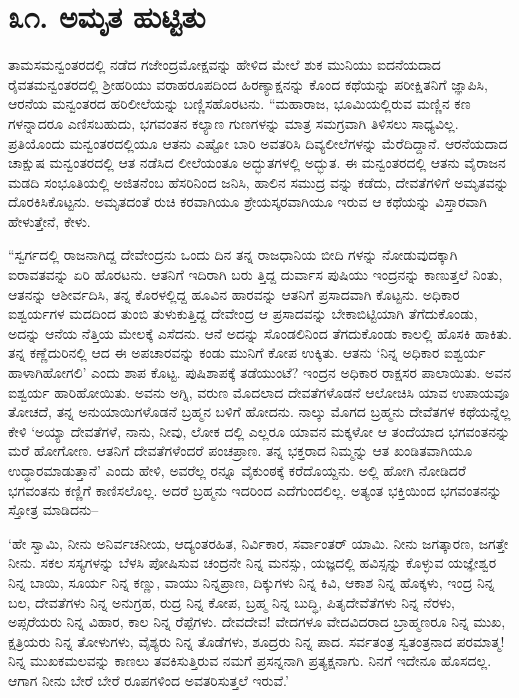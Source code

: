 
\chapter{೩೧. ಅಮೃತ ಹುಟ್ಟಿತು}

ತಾಮಸಮನ್ವಂತರದಲ್ಲಿ ನಡೆದ ಗಜೇಂದ್ರಮೋಕ್ಷವನ್ನು ಹೇಳಿದ ಮೇಲೆ ಶುಕ ಮುನಿಯು ಐದನೆಯದಾದ ರೈವತಮನ್ವಂತರದಲ್ಲಿ ಶ್ರೀಹರಿಯು ವರಾಹರೂಪದಿಂದ ಹಿರಣ್ಯಾಕ್ಷನನ್ನು ಕೊಂದ ಕಥೆಯನ್ನು ಪರೀಕ್ಷಿತನಿಗೆ ಜ್ಞಾಪಿಸಿ, ಆರನೆಯ ಮನ್ವಂತರದ ಹರಿಲೀಲೆಯನ್ನು ಬಣ್ಣಿಸಹೊರಟನು. “ಮಹಾರಾಜ, ಭೂಮಿಯಲ್ಲಿರುವ ಮಣ್ಣಿನ ಕಣ ಗಳನ್ನಾದರೂ ಎಣಿಸಬಹುದು, ಭಗವಂತನ ಕಲ್ಯಾಣ ಗುಣಗಳನ್ನು ಮಾತ್ರ ಸಮಗ್ರವಾಗಿ ತಿಳಿಸಲು ಸಾಧ್ಯವಿಲ್ಲ. ಪ್ರತಿಯೊಂದು ಮನ್ವಂತರದಲ್ಲಿಯೂ ಆತನು ಎಷ್ಟೋ ಬಾರಿ ಅವತರಿಸಿ ದಿವ್ಯಲೀಲೆಗಳನ್ನು ಮೆರೆದಿದ್ದಾನೆ. ಆರನೆಯದಾದ ಚಾಕ್ಷುಷ ಮನ್ವಂತರದಲ್ಲಿ ಆತ ನಡೆಸಿದ ಲೀಲೆಯಂತೂ ಅದ್ಭುತಗಳಲ್ಲಿ ಅದ್ಭುತ. ಈ ಮನ್ವಂತರದಲ್ಲಿ ಆತನು ವೈರಾಜನ ಮಡದಿ ಸಂಭೂತಿಯಲ್ಲಿ ಅಜಿತನೆಂಬ ಹೆಸರಿನಿಂದ ಜನಿಸಿ, ಹಾಲಿನ ಸಮುದ್ರ ವನ್ನು ಕಡೆದು, ದೇವತೆಗಳಿಗೆ ಅಮೃತವನ್ನು ದೊರಕಿಸಿಕೊಟ್ಟನು. ಅಮೃತದಂತೆ ರುಚಿ ಕರವಾಗಿಯೂ ಶ್ರೇಯಸ್ಕರವಾಗಿಯೂ ಇರುವ ಆ ಕಥೆಯನ್ನು ವಿಸ್ತಾರವಾಗಿ ಹೇಳುತ್ತೇನೆ, ಕೇಳು. 

“ಸ್ವರ್ಗದಲ್ಲಿ ರಾಜನಾಗಿದ್ದ ದೇವೇಂದ್ರನು ಒಂದು ದಿನ ತನ್ನ ರಾಜಧಾನಿಯ ಬೀದಿ ಗಳನ್ನು ನೋಡುವುದಕ್ಕಾಗಿ ಐರಾವತವನ್ನು ಏರಿ ಹೊರಟನು. ಆತನಿಗೆ ಇದಿರಾಗಿ ಬರು ತ್ತಿದ್ದ ದುರ್ವಾಸ ಪುಷಿಯು ಇಂದ್ರನನ್ನು ಕಾಣುತ್ತಲೆ ನಿಂತು, ಆತನನ್ನು ಆಶೀರ್ವದಿಸಿ, ತನ್ನ ಕೊರಳಲ್ಲಿದ್ದ ಹೂವಿನ ಹಾರವನ್ನು ಆತನಿಗೆ ಪ್ರಸಾದವಾಗಿ ಕೊಟ್ಟನು. ಅಧಿಕಾರ ಐಶ್ವರ್ಯಗಳ ಮದದಿಂದ ತುಂಬಿ ತುಳುಕುತ್ತಿದ್ದ ದೇವೇಂದ್ರ ಆ ಪ್ರಸಾದವನ್ನು ಬೇಕಾಬಿಟ್ಟಿಯಾಗಿ ತೆಗೆದುಕೊಂಡು, ಅದನ್ನು ಆನೆಯ ನೆತ್ತಿಯ ಮೇಲಕ್ಕೆ ಎಸೆದನು. ಆನೆ ಅದನ್ನು ಸೊಂಡಲಿನಿಂದ ತೆಗದುಕೊಂಡು ಕಾಲಲ್ಲಿ ಹೊಸಕಿ ಹಾಕಿತು. ತನ್ನ ಕಣ್ಣೆದುರಿನಲ್ಲಿ ಆದ ಈ ಅಪಚಾರವನ್ನು ಕಂಡು ಮುನಿಗೆ ಕೋಪ ಉಕ್ಕಿತು. ಆತನು ‘ನಿನ್ನ ಅಧಿಕಾರ ಐಶ್ವರ್ಯ ಹಾಳಾಗಿಹೋಗಲಿ’ ಎಂದು ಶಾಪ ಕೊಟ್ಟ. ಪುಷಿಶಾಪಕ್ಕೆ ತಡೆಯುಂಟೆ? ಇಂದ್ರನ ಅಧಿಕಾರ ರಾಕ್ಷಸರ ಪಾಲಾಯಿತು. ಅವನ ಐಶ್ವರ್ಯ ಹಾರಿಹೋಯಿತು. ಅವನು ಅಗ್ನಿ, ವರುಣ ಮೊದಲಾದ ದೇವತೆಗಳೊಡನೆ ಆಲೋಚಿಸಿ ಯಾವ ಉಪಾಯವೂ ತೋಚದೆ, ತನ್ನ ಅನುಯಾಯಿಗಳೊಡನೆ ಬ್ರಹ್ಮನ ಬಳಿಗೆ ಹೋದನು. ನಾಲ್ಕು ಮೊಗದ ಬ್ರಹ್ಮನು ದೇವೆತಗಳ ಕಥೆಯನ್ನೆಲ್ಲ ಕೇಳಿ ‘ಅಯ್ಯಾ ದೇವತೆಗಳೆ, ನಾನು, ನೀವು, ಲೋಕ ದಲ್ಲಿ ಎಲ್ಲರೂ ಯಾವನ ಮಕ್ಕಳೋ ಆ ತಂದೆಯಾದ ಭಗವಂತನನ್ನು ಮರೆ ಹೋಗೋಣ. ಆತನಿಗೆ ದೇವತೆಗಳೆಂದರೆ ಪಂಚಪ್ರಾಣ. ತನ್ನ ಭಕ್ತರಾದ ನಿಮ್ಮನ್ನು ಆತ ಖಂಡಿತವಾಗಿಯೂ ಉದ್ಧಾರಮಾಡುತ್ತಾನೆ’ ಎಂದು ಹೇಳಿ, ಅವರೆಲ್ಲ ರನ್ನೂ ವೈಕುಂಠಕ್ಕೆ ಕರೆದೊಯ್ದನು. ಅಲ್ಲಿ ಹೋಗಿ ನೋಡಿದರೆ ಭಗವಂತನು ಕಣ್ಣಿಗೆ ಕಾಣಿಸಲೊಲ್ಲ. ಅದರೆ ಬ್ರಹ್ಮನು ಇದರಿಂದ ಎದೆಗುಂದಲಿಲ್ಲ. ಅತ್ಯಂತ ಭಕ್ತಿಯಿಂದ ಭಗವಂತನನ್ನು ಸ್ತೋತ್ರ ಮಾಡಿದನು–

‘ಹೇ ಸ್ವಾಮಿ, ನೀನು ಅನಿರ್ವಚನೀಯ, ಆದ್ಯಂತರಹಿತ, ನಿರ್ವಿಕಾರ, ಸರ್ವಾಂತರ್ ಯಾಮಿ. ನೀನು ಜಗತ್ಕಾರಣ, ಜಗತ್ತೇ ನೀನು. ಸಕಲ ಸಸ್ಯಗಳನ್ನು ಬೆಳಸಿ ಪೋಷಿಸುವ ಚಂದ್ರನೇ ನಿನ್ನ ಮನಸ್ಸು, ಯಜ್ಞದಲ್ಲಿ ಹವಿಸ್ಸನ್ನು ಕೊಳ್ಳುವ ಯಜ್ಞೇಶ್ವರ ನಿನ್ನ ಬಾಯಿ, ಸೂರ್ಯ ನಿನ್ನ ಕಣ್ಣು, ವಾಯು ನಿನ್ನಪ್ರಾಣ, ದಿಕ್ಕುಗಳು ನಿನ್ನ ಕಿವಿ, ಆಕಾಶ ನಿನ್ನ ಹೊಕ್ಕಳು, ಇಂದ್ರ ನಿನ್ನ ಬಲ, ದೇವತೆಗಳು ನಿನ್ನ ಅನುಗ್ರಹ, ರುದ್ರ ನಿನ್ನ ಕೋಪ, ಬ್ರಹ್ಮ ನಿನ್ನ ಬುದ್ಧಿ, ಪಿತೃದೇವೆತೆಗಳು ನಿನ್ನ ನೆರಳು, ಅಪ್ಸರೆಯರು ನಿನ್ನ ವಿಹಾರ, ಕಾಲ ನಿನ್ನ ರೆಪ್ಪೆಗಳು. ದೇವದೇವ! ವೇದಗಳೂ ವೇದವಿದರಾದ ಬ್ರಾಹ್ಮಣರೂ ನಿನ್ನ ಮುಖ, ಕ್ಷತ್ರಿಯರು ನಿನ್ನ ತೋಳುಗಳು, ವೈಶ್ಯರು ನಿನ್ನ ತೊಡೆಗಳು, ಶೂದ್ರರು ನಿನ್ನ ಪಾದ. ಸರ್ವತಂತ್ರ ಸ್ವತಂತ್ರನಾದ ಪರಮಾತ್ಮ! ನಿನ್ನ ಮುಖಕಮಲವನ್ನು ಕಾಣಲು ತವಕಿಸುತ್ತಿರುವ ನಮಗೆ ಪ್ರಸನ್ನನಾಗಿ ಪ್ರತ್ಯಕ್ಷನಾಗು. ನಿನಗೆ ಇದೇನೂ ಹೊಸದಲ್ಲ. ಆಗಾಗ ನೀನು ಬೇರೆ ಬೇರೆ ರೂಪಗಳಿಂದ ಅವತರಿಸುತ್ತಲೆ ಇರುವೆ.’

